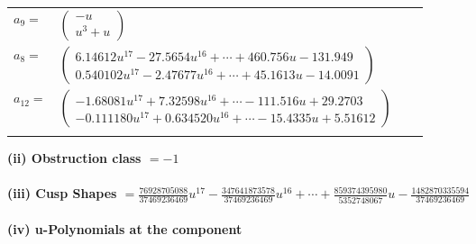 \documentclass[1p]{elsarticle_modified}
\theoremstyle{definition}
\begin{document}
\begin{tabular}{m{7pt} m{180pt} m{7pt} m{180pt} }
\flushright $a_{9}=$&$\begin{pmatrix}- u\\u^3+u\end{pmatrix}$ \\
\flushright $a_{8}=$&$\begin{pmatrix}6.14612 u^{17}-27.5654 u^{16}+\cdots+460.756 u-131.949\\0.540102 u^{17}-2.47677 u^{16}+\cdots+45.1613 u-14.0091\end{pmatrix}$ \\
\flushright $a_{12}=$&$\begin{pmatrix}-1.68081 u^{17}+7.32598 u^{16}+\cdots-111.516 u+29.2703\\-0.111180 u^{17}+0.634520 u^{16}+\cdots-15.4335 u+5.51612\end{pmatrix}$\\&\end{tabular}
\flushleft \textbf{(ii) Obstruction class $= -1$}\\~\\
\flushleft \textbf{(iii) Cusp Shapes $= \frac{76928705088}{37469236469} u^{17}-\frac{347641873578}{37469236469} u^{16}+\cdots+\frac{859374395980}{5352748067} u-\frac{1482870335594}{37469236469}$}\\~\\
\newpage\renewcommand{\arraystretch}{1}
\flushleft \textbf{(iv) u-Polynomials at the component}\newline \\
\end{document}
